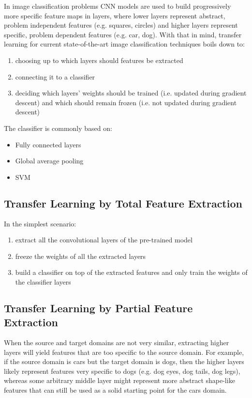 In image classification problems \ac{CNN} models are used to build progressively more specific feature maps in layers, where lower layers represent abstract, problem independent features (e.g. squares, circles) and higher layers represent specific, problem dependent features (e.g. car, dog). With that in mind, transfer learning for current state-of-the-art image classification techniques boils down to:

\begin{enumerate}
    \item choosing up to which layers should features be extracted
    \item connecting it to a classifier
    \item deciding which layers' weights should be trained (i.e. updated during gradient descent) and which should remain frozen (i.e. not updated during gradient descent)
\end{enumerate}

The classifier is commonly based on:

\begin{itemize}
    \item Fully connected layers
    \item Global average pooling
    \item SVM
\end{itemize}

\subsection{Transfer Learning by Total Feature Extraction}

In the simplest scenario:

\begin{enumerate}
    \item extract all the convolutional layers of the pre-trained model
    \item freeze the weights of all the extracted layers
    \item build a classifier on top of the extracted features and only train the weights of the classifier layers
\end{enumerate}

\subsection{Transfer Learning by Partial Feature Extraction}

When the source and target domains are not very similar, extracting higher layers will yield features that are too specific to the source domain. For example, if the source domain is cars but the target domain is dogs, then the higher layers likely represent features very specific to dogs (e.g. dog eyes, dog tails, dog legs), whereas some arbitrary middle layer might represent more abstract shape-like features that can still be used as a solid starting point for the cars domain.


